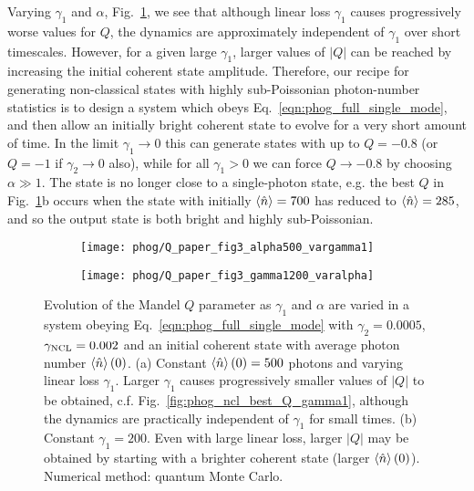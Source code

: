 Varying $\gamma_1$ and $\alpha$, Fig.~\ref{fig:phog_fig3paper2}, we see that although linear loss $\gamma_1$ causes progressively worse values for $Q$, the dynamics are approximately independent of $\gamma_1$ over short timescales. However, for a given large $\gamma_1$, larger values of $\left|Q\right|$ can be reached by increasing the initial coherent state amplitude. Therefore, our recipe for generating non-classical states with highly sub-Poissonian photon-number statistics is to design a system which obeys Eq.~\ref{eqn:phog_full_single_mode}, and then allow an initially bright coherent state to evolve for a very short amount of time. In the limit $\gamma_1 \rightarrow 0$ this can generate states with up to $Q = -0.8$ (or $Q=-1$ if $\gamma_2 \rightarrow 0$ also), while for all $\gamma_1 > 0$ we can force $Q \rightarrow -0.8$ by choosing $\alpha \gg 1$. The state is no longer close to a single-photon state, e.g. the best $Q$ in Fig.~\ref{fig:phog_fig3paper2}b occurs when the state with initially $\ev{\hat{n}}=700$ has reduced to $\ev{\hat{n}} = 285$, and so the output state is both bright and highly sub-Poissonian. %

\begin{figure}[htp]
\captionsetup{width=0.8\linewidth}
\centering
	\begin{subfigure}{0.7\linewidth}
	\centering
	\caption{}
	\texttt{[image: phog/Q\_paper\_fig3\_alpha500\_vargamma1]}
	\end{subfigure}
	\begin{subfigure}{0.7\linewidth}
	\centering
	\caption{}
	\texttt{[image: phog/Q\_paper\_fig3\_gamma1200\_varalpha]}
	\end{subfigure}
\caption{\label{fig:phog_fig3paper2} Evolution of the Mandel $Q$ parameter as $\gamma_1$ and $\alpha$ are varied in a system obeying Eq.~\ref{eqn:phog_full_single_mode} with $\gamma_2 = 0.0005$, $\gamma_{\text{NCL}} = 0.002$ and an initial coherent state with average photon number $\ev{\hat{n}}\left(0\right)$. (a) Constant $\ev{\hat{n}}\left(0\right) = 500$ photons and varying linear loss $\gamma_1$. Larger $\gamma_1$ causes progressively smaller values of $\left|Q\right|$ to be obtained, c.f. Fig.~\ref{fig:phog_ncl_best_Q_gamma1}, although the dynamics are practically independent of $\gamma_1$ for small times. (b) Constant $\gamma_1 = 200$. Even with large linear loss, larger $\left|Q\right|$ may be obtained by starting with a brighter coherent state (larger $\ev{\hat{n}}\left(0\right)$). Numerical method: quantum Monte Carlo.}
\end{figure}



